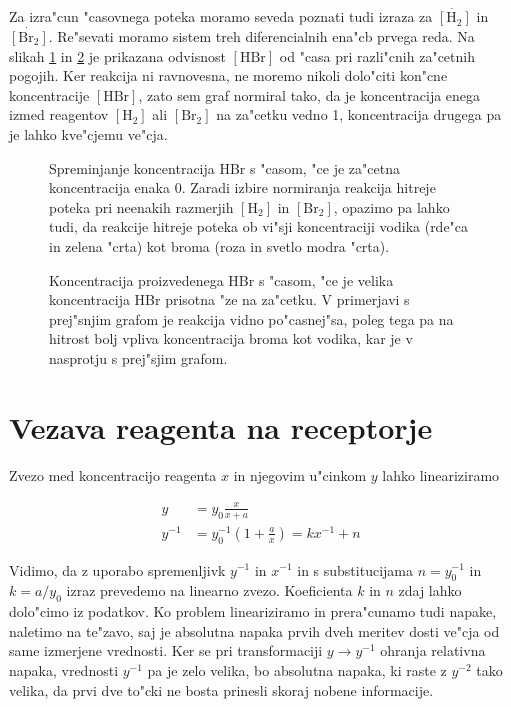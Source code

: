 \documentclass[a4paper,10pt]{article}
\newcommand{\HH}{\ensuremath{[\mathrm{H_2}]}}
\newcommand{\BBr}{\ensuremath{[\mathrm{Br_2}]}}
\newcommand{\HBr}{\ensuremath{[\mathrm{HBr}]}}
\begin{document}
Za izra"cun "casovnega poteka moramo seveda poznati tudi izraza za $\dot{\HH}$ in $\dot{\BBr}$. Re"sevati moramo sistem treh diferencialnih ena"cb prvega reda. Na slikah \ref{fig:stopnje} in \ref{fig:stopnje-hbr} je prikazana odvisnost $\HBr$ od "casa pri razli"cnih za"cetnih pogojih. Ker reakcija ni ravnovesna, ne moremo nikoli dolo"citi kon"cne koncentracije $\HBr$, zato sem graf normiral tako, da je koncentracija enega izmed reagentov $\HH$ ali $\BBr$ na za"cetku vedno 1, koncentracija drugega pa je lahko kve"cjemu ve"cja. 

\begin{figure}
 
  \caption{Spreminjanje koncentracija HBr s "casom, "ce je za"cetna koncentracija enaka 0. Zaradi izbire normiranja reakcija hitreje poteka pri neenakih razmerjih $\HH$ in $\BBr$, opazimo pa lahko tudi, da reakcije hitreje poteka ob vi"sji koncentraciji vodika (rde"ca in zelena "crta) kot broma (roza in svetlo modra "crta). }
\label{fig:stopnje}
\end{figure}

\begin{figure}
 
  \caption{Koncentracija proizvedenega HBr s "casom, "ce je velika koncentracija HBr prisotna "ze na za"cetku. V primerjavi s prej"snjim grafom je reakcija vidno po"casnej"sa, poleg tega pa na hitrost bolj vpliva koncentracija broma kot vodika, kar je v nasprotju s prej"sjim grafom.  }
\label{fig:stopnje-hbr}
\end{figure}

\clearpage
\section{Vezava reagenta na receptorje}

Zvezo med koncentracijo reagenta $x$ in njegovim u"cinkom $y$ lahko lineariziramo

\begin{align}
 y &= y_0\frac{x}{x+a} \\
  y^{-1} &= y_0^{-1} \left( 1 + \frac{a}{x} \right) = k x^{-1} + n
\end{align}

Vidimo, da z uporabo spremenljivk $y^{-1}$ in $x^{-1}$ in s substitucijama $n = y_0^{-1}$ in $k = a/y_0$ izraz prevedemo na linearno zvezo. Koeficienta $k$ in $n$ zdaj lahko dolo"cimo iz podatkov. Ko problem lineariziramo in prera"cunamo tudi napake, naletimo na te"zavo, saj je absolutna napaka prvih dveh meritev dosti ve"cja od same izmerjene vrednosti. Ker se pri transformaciji $y\to y^{-1}$ ohranja relativna napaka, vrednosti $y^{-1}$ pa je zelo velika, bo absolutna napaka, ki raste z $y^{-2}$ tako velika, da prvi dve to"cki ne bosta prinesli skoraj nobene informacije. 
\end{document}
